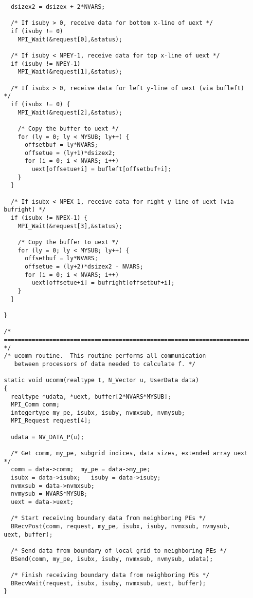 \begin{verbatim}
  dsizex2 = dsizex + 2*NVARS;
  
  /* If isuby > 0, receive data for bottom x-line of uext */
  if (isuby != 0)
    MPI_Wait(&request[0],&status);
  
  /* If isuby < NPEY-1, receive data for top x-line of uext */
  if (isuby != NPEY-1)
    MPI_Wait(&request[1],&status);

  /* If isubx > 0, receive data for left y-line of uext (via bufleft) */
  if (isubx != 0) {
    MPI_Wait(&request[2],&status);

    /* Copy the buffer to uext */
    for (ly = 0; ly < MYSUB; ly++) {
      offsetbuf = ly*NVARS;
      offsetue = (ly+1)*dsizex2;
      for (i = 0; i < NVARS; i++)
        uext[offsetue+i] = bufleft[offsetbuf+i];
    }
  }

  /* If isubx < NPEX-1, receive data for right y-line of uext (via bufright) */
  if (isubx != NPEX-1) {
    MPI_Wait(&request[3],&status);

    /* Copy the buffer to uext */
    for (ly = 0; ly < MYSUB; ly++) {
      offsetbuf = ly*NVARS;
      offsetue = (ly+2)*dsizex2 - NVARS;
      for (i = 0; i < NVARS; i++)
        uext[offsetue+i] = bufright[offsetbuf+i];
    }
  }

}

/* ======================================================================= */
/* ucomm routine.  This routine performs all communication 
   between processors of data needed to calculate f. */

static void ucomm(realtype t, N_Vector u, UserData data)
{
  realtype *udata, *uext, buffer[2*NVARS*MYSUB];
  MPI_Comm comm;
  integertype my_pe, isubx, isuby, nvmxsub, nvmysub;
  MPI_Request request[4];

  udata = NV_DATA_P(u);

  /* Get comm, my_pe, subgrid indices, data sizes, extended array uext */
  comm = data->comm;  my_pe = data->my_pe;
  isubx = data->isubx;   isuby = data->isuby;
  nvmxsub = data->nvmxsub;
  nvmysub = NVARS*MYSUB;
  uext = data->uext;

  /* Start receiving boundary data from neighboring PEs */
  BRecvPost(comm, request, my_pe, isubx, isuby, nvmxsub, nvmysub, uext, buffer);

  /* Send data from boundary of local grid to neighboring PEs */
  BSend(comm, my_pe, isubx, isuby, nvmxsub, nvmysub, udata);

  /* Finish receiving boundary data from neighboring PEs */
  BRecvWait(request, isubx, isuby, nvmxsub, uext, buffer);
}


\end{verbatim}
